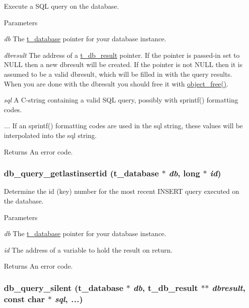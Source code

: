 Execute a SQL query on the database. 
\begin{DoxyParams}{Parameters}
\item[{\em db}]The \hyperlink{group__database_gad832ea0e5fc292661fd20046cee7e3b3}{t\_\-database} pointer for your database instance. \item[{\em dbresult}]The address of a \hyperlink{group__database_gae34db00cb98960e94b5ca58a7c21c362}{t\_\-db\_\-result} pointer. If the pointer is passed-\/in set to NULL then a new dbresult will be created. If the pointer is not NULL then it is assumed to be a valid dbresult, which will be filled in with the query results. When you are done with the dbresult you should free it with \hyperlink{group__obj_ga3759846cb356195532c41e35b87522ee}{object\_\-free()}. \item[{\em sql}]A C-\/string containing a valid SQL query, possibly with sprintf() formatting codes. \item[{\em ...}]If an sprintf() formatting codes are used in the sql string, these values will be interpolated into the sql string. \end{DoxyParams}
\begin{DoxyReturn}{Returns}
An error code. 
\end{DoxyReturn}
\hypertarget{group__database_ga534b71af369d49827855be8f07cc09bc}{
\subsubsection[{db\_\-query\_\-getlastinsertid}]{ db\_\-query\_\-getlastinsertid ({\bf t\_\-database} $\ast$ {\em db}, \/  long $\ast$ {\em id})}}
\label{group__database_ga534b71af369d49827855be8f07cc09bc}


Determine the id (key) number for the most recent INSERT query executed on the database. 
\begin{DoxyParams}{Parameters}
\item[{\em db}]The \hyperlink{group__database_gad832ea0e5fc292661fd20046cee7e3b3}{t\_\-database} pointer for your database instance. \item[{\em id}]The address of a variable to hold the result on return. \end{DoxyParams}
\begin{DoxyReturn}{Returns}
An error code. 
\end{DoxyReturn}
\hypertarget{group__database_gae756dda46aa61036ccc896ad9448c496}{
\subsubsection[{db\_\-query\_\-silent}]{ db\_\-query\_\-silent ({\bf t\_\-database} $\ast$ {\em db}, \/  {\bf t\_\-db\_\-result} $\ast$$\ast$ {\em dbresult}, \/  const char $\ast$ {\em sql}, \/   {\em ...})}}
\label{group__database_gae756dda46aa61036ccc896ad9448c496}


